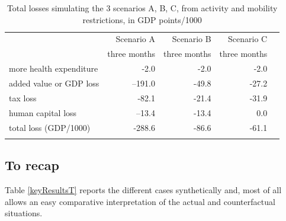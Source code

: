 \documentclass[graybox]{svmult}
\begin{document}
\begin{table}[t]
\centering
\begin{tabular}{lrrrr}
\hline\noalign{\smallskip}
& Scenario A & Scenario B & Scenario C \\
& three months & three months & three months \\
\noalign{\smallskip}\svhline\noalign{\smallskip}
more health expenditure & -2.0 & -2.0 & -2.0  \\
added value or GDP loss & --191.0 & -49.8 & -27.2 \\
tax loss & -82.1 & -21.4 & -31.9 \\
human capital loss &--13.4 & -13.4 & 0.0 \\
total loss (GDP/1000) & -288.6 & -86.6 & -61.1 \\
\hline\noalign{\smallskip}  
\end{tabular}
\caption{Total losses simulating the 3 scenarios A, B, C, from activity and mobility restrictions, in GDP points/1000}
\label{ABC2}
\end{table}




\subsection{To recap}
\label{recap}

Table \ref{keyResultsT} reports the different cases synthetically and, most of all allows an easy comparative interpretation of the actual and counterfactual situations.
\end{document}
